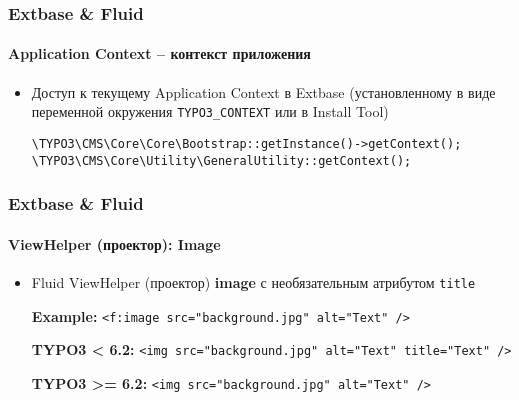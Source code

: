 
\begin{frame}[fragile]
	\frametitle{Extbase \& Fluid}
	\framesubtitle{Application Context – контекст приложения}

	\begin{itemize}
		\item Доступ к текущему Application Context в Extbase\newline
			(установленному в виде переменной окружения \texttt{TYPO3\_CONTEXT} или в Install Tool)
			\newline

			\lstinline!\TYPO3\CMS\Core\Core\Bootstrap::getInstance()->getContext();!
			\lstinline!\TYPO3\CMS\Core\Utility\GeneralUtility::getContext();!

	\end{itemize}

\end{frame}


\begin{frame}[fragile]
	\frametitle{Extbase \& Fluid}
	\framesubtitle{ViewHelper (проектор): Image}

	\begin{itemize}
		\item Fluid ViewHelper (проектор) \textbf{image} с необязательным атрибутом \texttt{title}\newline

			\smaller\textbf{Example:}\normalsize\newline
			\lstinline!<f:image src="background.jpg" alt="Text" />!
			\newline

			\smaller\textbf{TYPO3 < 6.2:}\normalsize\newline
			\lstinline!<img src="background.jpg" alt="Text" title="Text" />!
			\newline

			\smaller\textbf{TYPO3 >= 6.2:}\normalsize\newline
			\lstinline!<img src="background.jpg" alt="Text" />!

	\end{itemize}

\end{frame}

